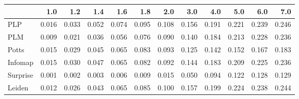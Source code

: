 \begin{tabular}{lrrrrrrrrrrr}
\toprule
{} &   1.0 &   1.2 &   1.4 &   1.6 &   1.8 &   2.0 &   3.0 &   4.0 &   5.0 &   6.0 &   7.0 \\
\midrule
PLP      & 0.016 & 0.033 & 0.052 & 0.074 & 0.095 & 0.108 & 0.156 & 0.191 & 0.221 & 0.239 & 0.246 \\
PLM      & 0.009 & 0.021 & 0.036 & 0.056 & 0.076 & 0.090 & 0.140 & 0.184 & 0.213 & 0.228 & 0.236 \\
Potts    & 0.015 & 0.029 & 0.045 & 0.065 & 0.083 & 0.093 & 0.125 & 0.142 & 0.152 & 0.167 & 0.183 \\
Infomap  & 0.015 & 0.030 & 0.047 & 0.065 & 0.082 & 0.092 & 0.144 & 0.183 & 0.209 & 0.225 & 0.236 \\
Surprise & 0.001 & 0.002 & 0.003 & 0.006 & 0.009 & 0.015 & 0.050 & 0.094 & 0.122 & 0.128 & 0.129 \\
Leiden   & 0.012 & 0.026 & 0.043 & 0.065 & 0.085 & 0.100 & 0.157 & 0.199 & 0.224 & 0.238 & 0.244 \\
\bottomrule
\end{tabular}
